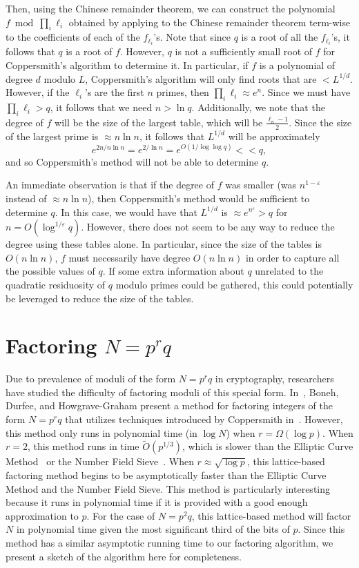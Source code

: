 \documentclass[letterpaper,twocolumn,10pt]{article}
\begin{document}
Then, using the Chinese remainder theorem, we can construct the polynomial $f \bmod \prod_i \ell_i$ obtained by applying to the Chinese remainder theorem term-wise to the coefficients of each of the $f_{\ell_i}$'s. Note that since $q$ is a root of all the $f_{\ell_i}$'s, it follows that $q$ is a root of $f$. However, $q$ is not a sufficiently small root of $f$ for Coppersmith's algorithm to determine it. In particular, if $f$ is a polynomial of degree $d$ modulo $L$, Coppersmith's algorithm will only find roots that are $< L^{1/d}$. However, if the $\ell_i$'s are the first $n$ primes, then $\prod_i \ell_i \approx e^n$. Since we must have $\prod_i \ell_i > q$, it follows that we need $n > \ln q$. Additionally, we note that the degree of $f$ will be the size of the largest table, which will be $\frac{\ell_n - 1}{2}$. Since the size of the largest prime is $\approx n \ln n$, it follows that $L^{1/d}$ will be approximately
\[
e^{2n/n\ln n} = e^{2/\ln n} = e^{O(1/\log \log q)}  << q,
\]  
and so Coppersmith's method will not be able to determine $q$.

An immediate observation is that if the degree of $f$ was smaller (was $n^{1 - \varepsilon}$ instead of $\approx n \ln n$), then Coppersmith's method would be sufficient to determine $q$. In this case, we would have that $L^{1/d}$ is $\approx e^{n^{\varepsilon}} > q$ for $n = O(\log^{1/\varepsilon} q)$. However, there does not seem to be any way to reduce the degree using these tables alone. In particular, since the size of the tables is $O(n \ln n)$, $f$ must necessarily have degree $O(n \ln n)$ in order to capture all the possible values of $q$. If some extra information about $q$ unrelated to the quadratic residuosity of $q$ modulo primes could be gathered, this could potentially be leveraged to reduce the size of the tables. 

\section{Factoring $N = p^rq$}
\label{prq}

Due to prevalence of moduli of the form $N = p^r q$ in cryptography, researchers have studied the difficulty of factoring moduli of this special form. In~\cite{dan}, Boneh, Durfee, and Howgrave-Graham present a method for factoring integers of the form $N = p^r q$ that utilizes techniques introduced by Coppersmith in~\cite{Coppersmith1997}. However, this method only runs in polynomial time (in $\log N$) when $r = \Omega(\log p)$. When $r = 2$, this method runs in time $\tilde{O}(p^{1/3})$, which is slower than the Elliptic Curve Method~\cite{Lenstra} or the Number Field Sieve~\cite{pomerance}. When $r \approx \sqrt{\log p}$, this lattice-based factoring method begins to be asymptotically faster than the Elliptic Curve Method and the Number Field Sieve. This method is particularly interesting because it runs in polynomial time if it is provided with a good enough approximation to $p$. For the case of $N = p^2 q$, this lattice-based method will factor $N$ in polynomial time given the most significant third of the bits of $p$. Since this method has a similar asymptotic running time to our factoring algorithm, we present a sketch of the algorithm here for completeness.
\end{document}
